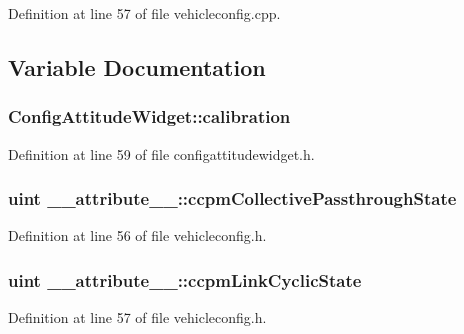 Definition at line 57 of file vehicleconfig.\-cpp.



\subsection{Variable Documentation}
\hypertarget{group___config_plugin_ga4b85d588b6292a6f8755725ccca770fb}{
\subsubsection[{calibration}]{ Config\-Attitude\-Widget\-::calibration\hspace{0.3cm}{\ttfamily [protected]}}}\label{group___config_plugin_ga4b85d588b6292a6f8755725ccca770fb}


Definition at line 59 of file configattitudewidget.\-h.

\hypertarget{group___config_plugin_ga14bffa0ebae107df7ec9a9b6e06294a9}{
\subsubsection[{ccpm\-Collective\-Passthrough\-State}]{\setlength{\rightskip}{0pt plus 5cm}uint \-\_\-\-\_\-attribute\-\_\-\-\_\-\-::ccpm\-Collective\-Passthrough\-State}}\label{group___config_plugin_ga14bffa0ebae107df7ec9a9b6e06294a9}


Definition at line 56 of file vehicleconfig.\-h.

\hypertarget{group___config_plugin_ga31785760b6dab4f2006d4824ef4b7e5b}{
\subsubsection[{ccpm\-Link\-Cyclic\-State}]{\setlength{\rightskip}{0pt plus 5cm}uint \-\_\-\-\_\-attribute\-\_\-\-\_\-\-::ccpm\-Link\-Cyclic\-State}}\label{group___config_plugin_ga31785760b6dab4f2006d4824ef4b7e5b}


Definition at line 57 of file vehicleconfig.\-h.

